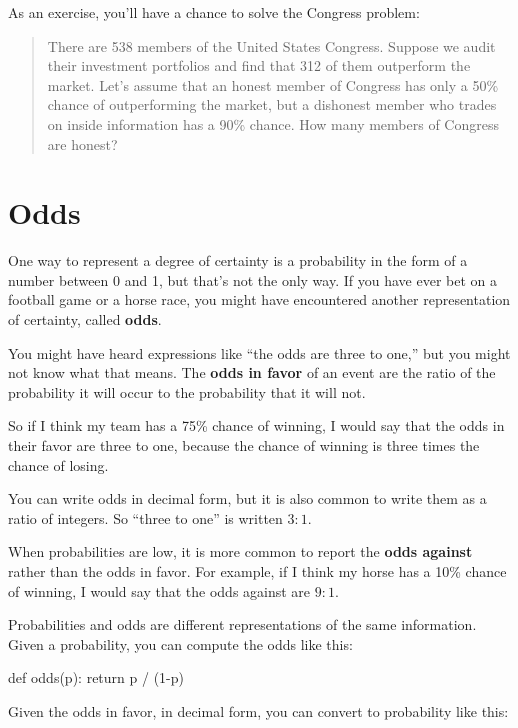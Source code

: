 \documentclass[12pt]{book}
\theoremstyle{exercise}
\begin{document}
As an exercise, you'll have a chance to solve the Congress problem:

\begin{quote}
There are 538 members of the United States Congress.  
Suppose we audit their investment portfolios and find that 312 of them outperform the market.
Let's assume that an honest member of Congress has only a 50\% chance of outperforming the market, but a dishonest member who trades on inside information has a 90\% chance.  How many members of Congress are honest?
\end{quote}


\section{Odds}

One way to represent a degree of certainty is a probability in the form of a number between 0 and 1, but that's not the only way.  
If you have ever bet on a football game or a horse race, you might have encountered another representation of certainty, called {\bf odds}.


You might have heard expressions like ``the odds are
three to one,'' but you might not know what that means.  
The {\bf odds in favor} of an event are the ratio of the probability
it will occur to the probability that it will not.

So if I think my team has a 75\% chance of winning, I would
say that the odds in their favor are three to one, because
the chance of winning is three times the chance of losing.

You can write odds in decimal form, but it is also common to
write them as a ratio of integers.  So ``three to one'' is
written $3:1$.

When probabilities are low, it is more common to report the
{\bf odds against} rather than the odds in favor.  For
example, if I think my horse has a 10\% chance of winning,
I would say that the odds against are $9:1$.

Probabilities and odds are different representations of the
same information.  Given a probability, you can compute the
odds like this:

\begin{code}
def odds(p):
    return p / (1-p)
\end{code}

Given the odds in favor, in decimal form, you can convert to probability like this:
\end{document}
